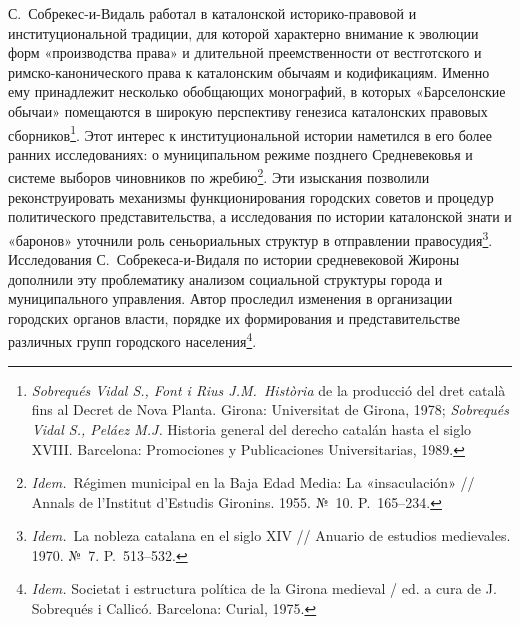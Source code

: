 С.~Собрекес-и-Видаль работал в каталонской историко-правовой и институциональной традиции, для которой характерно внимание к эволюции форм «производства права» и длительной преемственности от вестготского и римско-канонического права к каталонским обычаям и кодификациям. Именно ему принадлежит несколько обобщающих монографий, в которых «Барселонские обычаи» помещаются в широкую перспективу генезиса каталонских правовых сборников\footnote{\emph{Sobrequés Vidal S., Font i Rius J.M.~Història} de la producció del dret català fins al Decret de Nova Planta. Girona: Universitat de Girona, 1978; \emph{Sobrequés Vidal S., Peláez M.J.} Historia general del derecho catalán hasta el siglo XVIII. Barcelona: Promociones y Publicaciones Universitarias, 1989.}. Этот интерес к институциональной истории наметился в его более ранних исследованиях: о муниципальном режиме позднего Средневековья и системе выборов чиновников по жребию\footnote{\emph{Idem.}~Régimen municipal en la Baja Edad Media: La «insaculación» // Annals de l’Institut d’Estudis Gironins. 1955. №~10. P.~165--234.}. Эти изыскания позволили реконструировать механизмы функционирования городских советов и процедур политического представительства, а исследования по истории каталонской знати и «баронов» уточнили роль сеньориальных структур в отправлении правосудия\footnote{\emph{Idem.}~La nobleza catalana en el siglo XIV // Anuario de estudios medievales. 1970. №~7. P.~513--532.}. Исследования С.~Собрекеса-и-Видаля по истории средневековой Жироны дополнили эту проблематику анализом социальной структуры города и муниципального управления. Автор проследил изменения в организации городских органов власти, порядке их формирования и представительстве различных групп городского населения\footnote{\emph{Idem.}\emph{ }Societat i estructura política de la Girona medieval / ed. a cura de J. Sobrequés i Callicó. Barcelona: Curial, 1975.}.

